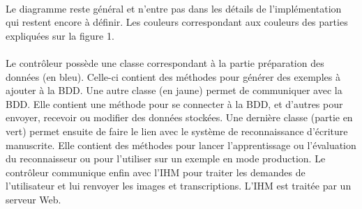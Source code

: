 \paragraph{}

Le diagramme reste général et n’entre pas dans les détails de l’implémentation qui restent encore à définir. Les couleurs correspondant aux couleurs des parties expliquées sur la figure 1.

\paragraph{}

Le contrôleur possède une classe correspondant à la partie préparation des données (en bleu). Celle-ci contient des méthodes pour générer des exemples à ajouter à la BDD. Une autre classe (en jaune) permet de communiquer avec la BDD. Elle contient une méthode pour se connecter à la BDD, et d’autres pour envoyer, recevoir ou modifier des données stockées. Une dernière classe (partie en vert) permet ensuite de faire le lien avec le système de reconnaissance d’écriture manuscrite. Elle contient des méthodes pour lancer l’apprentissage ou l’évaluation du reconnaisseur ou pour l’utiliser sur un exemple en mode production.
Le contrôleur communique enfin avec l’IHM pour traiter les demandes de l’utilisateur et lui renvoyer les images et transcriptions. L’IHM est traitée par un serveur Web.




